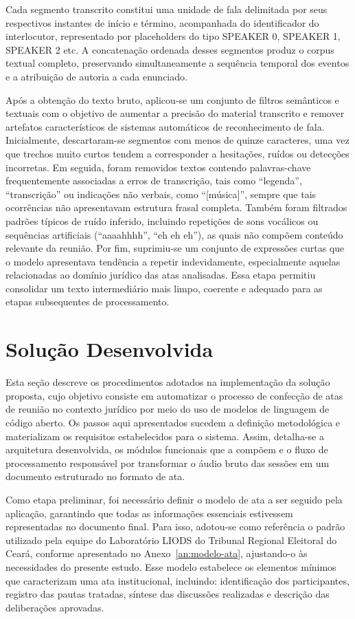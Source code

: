 Cada segmento transcrito constitui uma unidade de fala delimitada por seus respectivos instantes de início e término, acompanhada do identificador do interlocutor, representado por placeholders do tipo SPEAKER 0, SPEAKER 1, SPEAKER 2 etc. A concatenação ordenada desses segmentos produz o corpus textual completo, preservando simultaneamente a sequência temporal dos eventos e a atribuição de autoria a cada enunciado.

Após a obtenção do texto bruto, aplicou-se um conjunto de filtros semânticos e textuais com o objetivo de aumentar a precisão do material transcrito e remover artefatos característicos de sistemas automáticos de reconhecimento de fala. Inicialmente, descartaram-se segmentos com menos de quinze caracteres, uma vez que trechos muito curtos tendem a corresponder a hesitações, ruídos ou detecções incorretas. Em seguida, foram removidos textos contendo palavras-chave frequentemente associadas a erros de transcrição, tais como “legenda”, “transcrição” ou indicações não verbais, como “[música]”, sempre que tais ocorrências não apresentavam estrutura frasal completa. Também foram filtrados padrões típicos de ruído inferido, incluindo repetições de sons vocálicos ou sequências artificiais (“aaaahhhh”, “eh eh eh”), as quais não compõem conteúdo relevante da reunião. Por fim, suprimiu-se um conjunto de expressões curtas que o modelo apresentava tendência a repetir indevidamente, especialmente aquelas relacionadas ao domínio jurídico das atas analisadas. Essa etapa permitiu consolidar um texto intermediário mais limpo, coerente e adequado para as etapas subsequentes de processamento.

\section{Solução Desenvolvida}
\label{sec:solucao-desenvolvida}

Esta seção descreve os procedimentos adotados na implementação da solução proposta, cujo objetivo consiste em automatizar o processo de confecção de atas de reunião no contexto jurídico por meio do uso de modelos de linguagem de código aberto. Os passos aqui apresentados sucedem a definição metodológica e materializam os requisitos estabelecidos para o sistema. Assim, detalha-se a arquitetura desenvolvida, os módulos funcionais que a compõem e o fluxo de processamento responsável por transformar o áudio bruto das sessões em um documento estruturado no formato de ata.

Como etapa preliminar, foi necessário definir o modelo de ata a ser seguido pela aplicação, garantindo que todas as informações essenciais estivessem representadas no documento final. Para isso, adotou-se como referência o padrão utilizado pela equipe do Laboratório LIODS do Tribunal Regional Eleitoral do Ceará, conforme apresentado no Anexo~\ref{an:modelo-ata}, ajustando-o às necessidades do presente estudo. Esse modelo estabelece os elementos mínimos que caracterizam uma ata institucional, incluindo: identificação dos participantes, registro das pautas tratadas, síntese das discussões realizadas e descrição das deliberações aprovadas.

